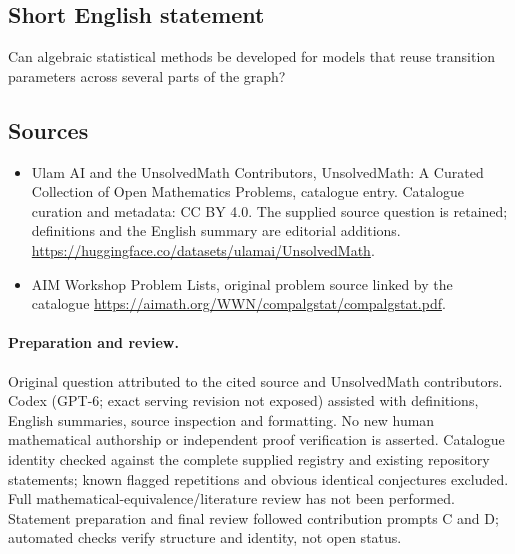 \documentclass[11pt]{article}
\begin{document}
\subsection{Short English statement}
Can algebraic statistical methods be developed for models that reuse transition parameters across several parts of the graph?
\subsection{Sources}
\begin{itemize}
\item[\hypertarget{source:statement:1}{S1}] Ulam AI and the UnsolvedMath Contributors, UnsolvedMath: A Curated Collection of Open Mathematics Problems, catalogue entry. Catalogue curation and metadata: CC BY 4.0. The supplied source question is retained; definitions and the English summary are editorial additions.
\url{https://huggingface.co/datasets/ulamai/UnsolvedMath}.
\item[\hypertarget{source:statement:2}{S2}] AIM Workshop Problem Lists, original problem source linked by the catalogue
\url{https://aimath.org/WWN/compalgstat/compalgstat.pdf}.
\end{itemize}
\paragraph{Preparation and review.}
Original question attributed to the cited source and UnsolvedMath contributors. Codex (GPT-6; exact serving revision not exposed) assisted with definitions, English summaries, source inspection and formatting. No new human mathematical authorship or independent proof verification is asserted. Catalogue identity checked against the complete supplied registry and existing repository statements; known flagged repetitions and obvious identical conjectures excluded. Full mathematical-equivalence/literature review has not been performed. Statement preparation and final review followed contribution prompts C and D; automated checks verify structure and identity, not open status.
\label{end:statement}
\end{document}
